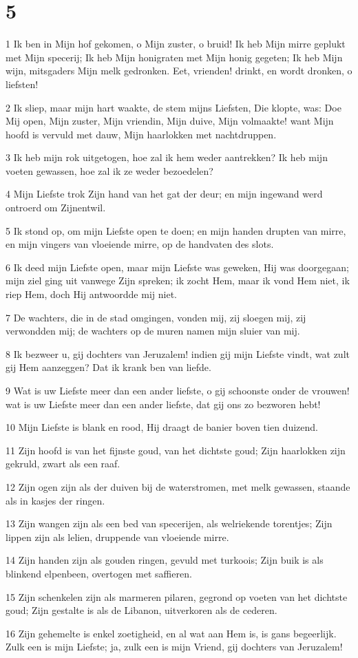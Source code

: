 \chapter{5}

\par 1 Ik ben in Mijn hof gekomen, o Mijn zuster, o bruid! Ik heb Mijn mirre geplukt met Mijn specerij; Ik heb Mijn honigraten met Mijn honig gegeten; Ik heb Mijn wijn, mitsgaders Mijn melk gedronken. Eet, vrienden! drinkt, en wordt dronken, o liefsten!
\par 2 Ik sliep, maar mijn hart waakte, de stem mijns Liefsten, Die klopte, was: Doe Mij open, Mijn zuster, Mijn vriendin, Mijn duive, Mijn volmaakte! want Mijn hoofd is vervuld met dauw, Mijn haarlokken met nachtdruppen.
\par 3 Ik heb mijn rok uitgetogen, hoe zal ik hem weder aantrekken? Ik heb mijn voeten gewassen, hoe zal ik ze weder bezoedelen?
\par 4 Mijn Liefste trok Zijn hand van het gat der deur; en mijn ingewand werd ontroerd om Zijnentwil.
\par 5 Ik stond op, om mijn Liefste open te doen; en mijn handen drupten van mirre, en mijn vingers van vloeiende mirre, op de handvaten des slots.
\par 6 Ik deed mijn Liefste open, maar mijn Liefste was geweken, Hij was doorgegaan; mijn ziel ging uit vanwege Zijn spreken; ik zocht Hem, maar ik vond Hem niet, ik riep Hem, doch Hij antwoordde mij niet.
\par 7 De wachters, die in de stad omgingen, vonden mij, zij sloegen mij, zij verwondden mij; de wachters op de muren namen mijn sluier van mij.
\par 8 Ik bezweer u, gij dochters van Jeruzalem! indien gij mijn Liefste vindt, wat zult gij Hem aanzeggen? Dat ik krank ben van liefde.
\par 9 Wat is uw Liefste meer dan een ander liefste, o gij schoonste onder de vrouwen! wat is uw Liefste meer dan een ander liefste, dat gij ons zo bezworen hebt!
\par 10 Mijn Liefste is blank en rood, Hij draagt de banier boven tien duizend.
\par 11 Zijn hoofd is van het fijnste goud, van het dichtste goud; Zijn haarlokken zijn gekruld, zwart als een raaf.
\par 12 Zijn ogen zijn als der duiven bij de waterstromen, met melk gewassen, staande als in kasjes der ringen.
\par 13 Zijn wangen zijn als een bed van specerijen, als welriekende torentjes; Zijn lippen zijn als lelien, druppende van vloeiende mirre.
\par 14 Zijn handen zijn als gouden ringen, gevuld met turkoois; Zijn buik is als blinkend elpenbeen, overtogen met saffieren.
\par 15 Zijn schenkelen zijn als marmeren pilaren, gegrond op voeten van het dichtste goud; Zijn gestalte is als de Libanon, uitverkoren als de cederen.
\par 16 Zijn gehemelte is enkel zoetigheid, en al wat aan Hem is, is gans begeerlijk. Zulk een is mijn Liefste; ja, zulk een is mijn Vriend, gij dochters van Jeruzalem!

